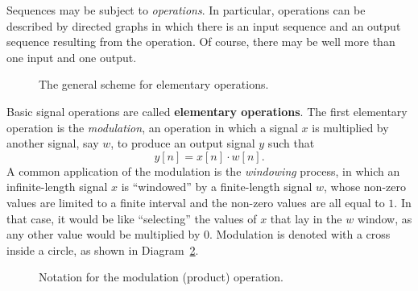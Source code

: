 \documentclass[\documentfontsize, twocolumn]{\classname}
\begin{document}
Se\-quen\-ces may be subject to \emph{operations}. In particular, operations can be described by directed graphs in which there is an input se\-quen\-ce and an output se\-quen\-ce resulting from the operation. Of course, there may be well more than one input and one output.

    \begin{figure}[ht]
\begin{center}
\caption{The general scheme for elementary operations.}\label{tikz:operation-scheme}
\end{center}
\end{figure}

Basic signal operations are called \textbf{elementary operations}. The first elementary operation is the \emph{modulation}, an operation in which a signal $x$ is multiplied by another signal, say $w$, to produce an output signal $y$ such that $$y[n] = x[n]\cdot w[n].$$ A common application of the modulation is the \emph{windowing} process, in which an infinite-length signal $x$ is ``windowed'' by a finite-length signal $w$, whose non-zero values are limited to a finite interval and the non-zero values are all equal to $1$. In that case, it would be like ``selecting'' the values of $x$ that lay in the $w$ window, as any other value would be multiplied by $0$. Modulation is denoted with a cross inside a circle, as shown in Diagram~\ref{tikz:modulation-operation}.

\begin{figure}[ht]
\begin{center}
    \caption{Notation for the modulation (product) operation.}\label{tikz:modulation-operation}
\end{center}
\end{figure}
\end{document}
